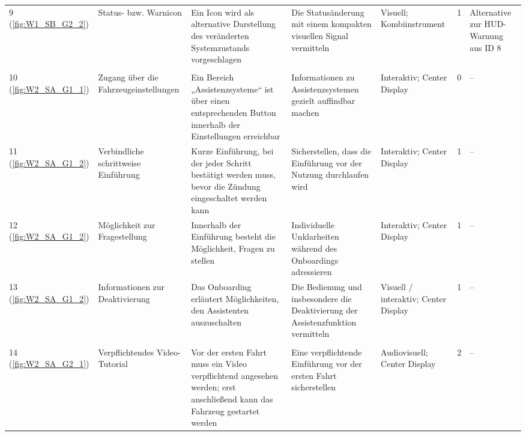 {\begin{xltabular}{\textwidth}{
    P{0.65cm}
    Y
    Y
    Y
    P{1.75cm}
    P{1.25cm}
    Y
}
\rowrule

9 (\ref{fig:W1_SB_G2_2}) &
Status- bzw. Warnicon &
Ein Icon wird als alternative Darstellung des veränderten Systemzustands vorgeschlagen &
Die Statusänderung mit einem kompakten visuellen Signal vermitteln &
Visuell; Kombiinstrument &
1 &
Alternative zur HUD-Warnung aus ID 8
\\

\rowrule
{}
\\
\rowrule

10 (\ref{fig:W2_SA_G1_1}) &
Zugang über die Fahrzeugeinstellungen &
Ein Bereich „Assistenzsysteme“ ist über einen entsprechenden Button innerhalb der Einstellungen erreichbar &
Informationen zu Assistenzsystemen gezielt auffindbar machen &
Interaktiv; Center Display &
0 &
--
\\

\rowrule

11 (\ref{fig:W2_SA_G1_2}) &
Verbindliche schrittweise Einführung &
Kurze Einführung, bei der jeder Schritt bestätigt werden muss, bevor die Zündung eingeschaltet werden kann &
Sicherstellen, dass die Einführung vor der Nutzung durchlaufen wird &
Interaktiv; Center Display &
1 &
--
\\

\rowrule

12 (\ref{fig:W2_SA_G1_2}) &
Möglichkeit zur Fragestellung &
Innerhalb der Einführung besteht die Möglichkeit, Fragen zu stellen &
Individuelle Unklarheiten während des Onboardings adressieren &
Interaktiv; Center Display &
1 &
--
\\

\rowrule

13 (\ref{fig:W2_SA_G1_2}) &
Informationen zur Deaktivierung &
Das Onboarding erläutert Möglichkeiten, den Assistenten auszuschalten &
Die Bedienung und insbesondere die Deaktivierung der Assistenzfunktion vermitteln &
Visuell / interaktiv; Center Display &
1 &
--
\\

\rowrule
{}
\\
\rowrule

14 (\ref{fig:W2_SA_G2_1}) &
Verpflichtendes Video-Tutorial &
Vor der ersten Fahrt muss ein Video verpflichtend angesehen werden; erst anschließend kann das Fahrzeug gestartet werden &
Eine verpflichtende Einführung vor der ersten Fahrt sicherstellen &
Audiovisuell; Center Display &
2 &
--
\\


\end{xltabular}}
